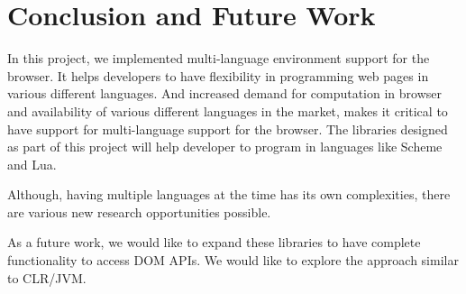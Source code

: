\chapter{Conclusion and Future Work}

In this project, we implemented multi-language environment support for the browser.
 It helps developers to have flexibility in programming web pages in various different languages. And increased demand for computation in browser and availability of various different languages in the market, makes it critical to have support for multi-language support for the browser. The libraries designed as part of this project will help developer to program in languages like Scheme and Lua. 
 
 Although, having multiple languages at the time has its own complexities, there are various new research opportunities possible. 

As a future work, we would like to expand these libraries to have complete functionality to access DOM APIs. We would like to explore the approach similar to CLR/JVM.
